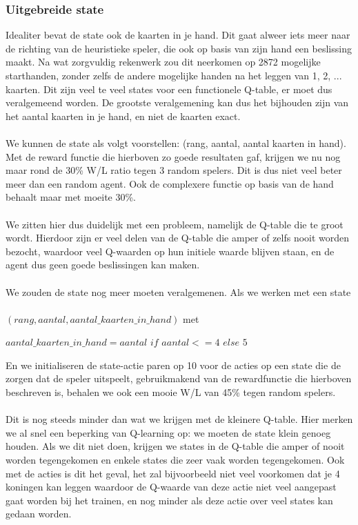 \documentclass[11pt]{article}
\begin{document}
\subsubsection{Uitgebreide state}
Idealiter bevat de state ook de kaarten in je hand. Dit gaat alweer iets meer naar de richting van de heuristieke speler, die ook op basis van zijn hand een beslissing maakt. Na wat zorgvuldig rekenwerk zou dit neerkomen op 2872 mogelijke starthanden, zonder zelfs de andere mogelijke handen na het leggen van 1, 2, ... kaarten. Dit zijn veel te veel states voor een functionele Q-table, er moet dus veralgemeend worden. De grootste veralgemening kan dus het bijhouden zijn van het aantal kaarten in je hand, en niet de kaarten exact.\\\\
We kunnen de state als volgt voorstellen: (rang, aantal, aantal kaarten in hand). Met de reward functie die hierboven zo goede resultaten gaf, krijgen we nu nog maar rond de 30\% W/L ratio tegen 3 random spelers. Dit is dus niet veel beter meer dan een random agent. Ook de complexere functie op basis van de hand behaalt maar met moeite 30\%. \\\\
We zitten hier dus duidelijk met een probleem, namelijk de Q-table die te groot wordt. Hierdoor zijn er veel delen van de Q-table die amper of zelfs nooit worden bezocht, waardoor veel Q-waarden op hun initiele waarde blijven staan, en de agent dus geen goede beslissingen kan maken.\\\\
We zouden de state nog meer moeten veralgemenen. Als we werken met een state\\\\
\indent $(rang, aantal, aantal\_kaarten\_in\_hand)$ met
\begin{center}
$aantal\_kaarten\_in\_hand = aantal$ $if$ $ aantal <= 4$ $else$ $5$
\end{center}
En we initialiseren de state-actie paren op 10 voor de acties op een state die de zorgen dat de speler uitspeelt, gebruikmakend van de rewardfunctie die hierboven beschreven is, behalen we ook een mooie W/L van 45\% tegen random spelers. \\\\
Dit is nog steeds minder dan wat we krijgen met de kleinere Q-table. Hier merken we al snel een beperking van Q-learning op: we moeten de state klein genoeg houden. Als we dit niet doen, krijgen we states in de Q-table die amper of nooit worden tegengekomen en enkele states die zeer vaak worden tegengekomen. Ook met de acties is dit het geval, het zal bijvoorbeeld niet veel voorkomen dat je 4 koningen kan leggen waardoor de Q-waarde van deze actie niet veel aangepast gaat worden bij het trainen, en nog minder als deze actie over veel states kan gedaan worden. \\\\
\end{document}
